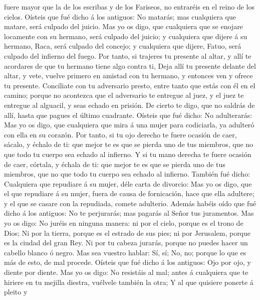 fuere mayor que la de los escribas y de los Fariseos, no entraréis en el
reino de los cielos.  Oísteis que fué dicho á los antiguos:
No matarás; mas cualquiera que matare, será culpado del juicio.
 Mas yo os digo, que cualquiera que se enojare locamente
con su hermano, será culpado del juicio; y cualquiera que dijere á su
hermano, Raca, será culpado del concejo; y cualquiera que dijere, Fatuo,
será culpado del infierno del fuego.  Por tanto, si
trajeres tu presente al altar, y allí te acordares de que tu hermano
tiene algo contra ti,  Deja allí tu presente delante del
altar, y vete, vuelve primero en amistad con tu hermano, y entonces ven
y ofrece tu presente.  Concíliate con tu adversario presto,
entre tanto que estás con él en el camino; porque no acontezca que el
adversario te entregue al juez, y el juez te entregue al alguacil, y
seas echado en prisión.  De cierto te digo, que no saldrás
de allí, hasta que pagues el último cuadrante.  Oísteis que
fué dicho: No adulterarás:  Mas yo os digo, que cualquiera
que mira á una mujer para codiciarla, ya adulteró con ella en su
corazón.  Por tanto, si tu ojo derecho te fuere ocasión de
caer, sácalo, y échalo de ti: que mejor te es que se pierda uno de tus
miembros, que no que todo tu cuerpo sea echado al infierno.
 Y si tu mano derecha te fuere ocasión de caer, córtala, y
échala de ti: que mejor te es que se pierda uno de tus miembros, que no
que todo tu cuerpo sea echado al infierno.  También fué
dicho: Cualquiera que repudiare á su mujer, déle carta de divorcio:
 Mas yo os digo, que el que repudiare á su mujer, fuera de
causa de fornicación, hace que ella adultere; y el que se casare con la
repudiada, comete adulterio.  Además habéis oído que fué
dicho á los antiguos: No te perjurarás; mas pagarás al Señor tus
juramentos.  Mas yo os digo: No juréis en ninguna manera:
ni por el cielo, porque es el trono de Dios;  Ni por la
tierra, porque es el estrado de sus pies; ni por Jerusalem, porque es la
ciudad del gran Rey.  Ni por tu cabeza jurarás, porque no
puedes hacer un cabello blanco ó negro.  Mas sea vuestro
hablar: Sí, sí; No, no; porque lo que es más de esto, de mal procede.
 Oísteis que fué dicho á los antiguos: Ojo por ojo, y
diente por diente.  Mas yo os digo: No resistáis al mal;
antes á cualquiera que te hiriere en tu mejilla diestra, vuélvele
también la otra;  Y al que quisiere ponerte á pleito y
